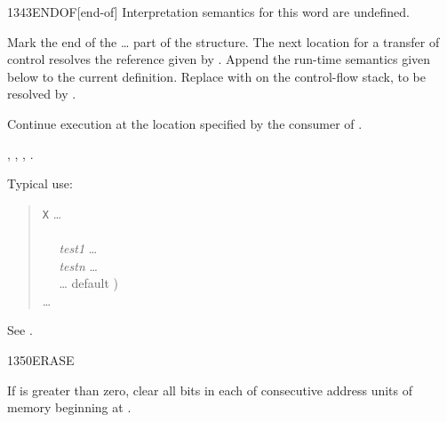 \begin{worddef}{1343}{ENDOF}[end-of]
\interpret
	Interpretation semantics for this word are undefined.

\compile

	Mark the end of the \ldots{} part of the
	 structure. The next location for a transfer of
	control resolves the reference given by . Append
	the run-time semantics given below to the current definition.
	Replace  with  on the
	control-flow stack, to be resolved by .

\runtime
	\stack{}{}

	Continue execution at the location specified by the consumer
	of .

\see {},
	,
	,
	.

	\begin{rationale} %
		Typical use:
		\begin{quote}
			\word{:} \texttt{X} {\ldots} \\
			\tab {} \\
			\tab~~ \emph{test1}  {\ldots}  \\
			\tab~~ \emph{testn}  {\ldots}  \\
			\tab~~ {\ldots}  default ) \\
			\tab {} {\ldots} \\
			\word{;}
		\end{quote}
	\end{rationale}

	\begin{testing}
		See .
	\end{testing}
\end{worddef}


\begin{worddef}{1350}{ERASE}
\item {}

	If  is greater than zero, clear all bits in each of
	 consecutive address units of memory beginning at
	.
\end{worddef}


